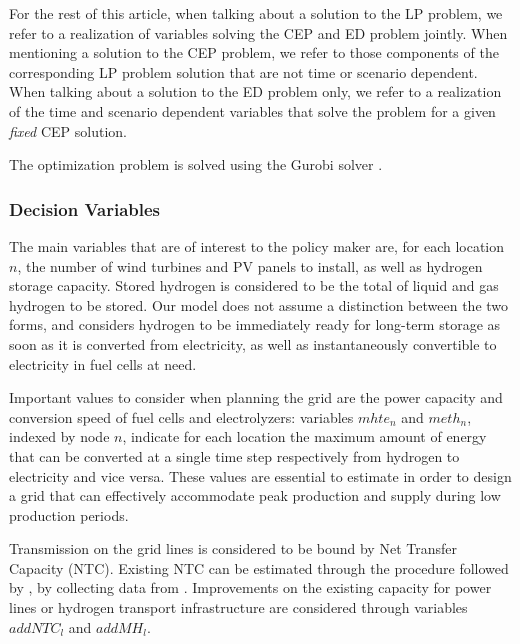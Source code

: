 \documentclass[smallextended,natbib]{svjour3}       %
\numberwithin{theorem}{section}
\begin{document}
For the rest of this article, when talking about a solution to the LP problem, we refer to a realization of variables solving the CEP and ED problem jointly. 
When mentioning a solution to the CEP problem, we refer to those components of the corresponding LP problem solution that are not time or scenario dependent. 
When talking about a solution to the ED problem only, we refer to a realization of the time and scenario dependent variables that solve the problem for a given \textit{fixed} CEP solution.

The optimization problem is solved using the Gurobi solver \citep{INTRO_gurobi}.



\subsubsection{Decision Variables}

The main variables that are of interest to the policy maker are, for each location $n$, the number of wind turbines and PV panels to install, as well as hydrogen storage capacity.
Stored hydrogen is considered to be the total of liquid and gas hydrogen to be stored. 
Our model does not assume a distinction between the two forms, and considers hydrogen to be immediately ready for long-term storage as soon as it is converted from electricity, as well as instantaneously convertible to electricity in fuel cells at need. 

Important values to consider when planning the grid are the power capacity and conversion speed of fuel cells and electrolyzers: variables $mhte_n$ and $meth_n$, indexed by node $n$, indicate for each location the maximum amount of energy that can be converted at a single time step respectively from hydrogen to electricity and vice versa. 
These values are essential to estimate in order to design a grid that can effectively accommodate peak production and supply during low production periods.

Transmission on the grid lines is considered to be bound by Net Transfer Capacity (NTC). 
Existing NTC can be estimated through the procedure followed by \citet[chapter 5]{tesi_NTC}, by collecting data from \cite{entsoe_NTC}. 
Improvements on the existing capacity for power lines or hydrogen transport infrastructure are considered through variables $addNTC_l$ and $addMH_l$.
\end{document}
